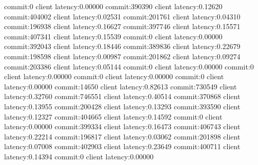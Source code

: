commit:0 client latency:0.00000
commit:390390 client latency:0.12620
commit:404002 client latency:0.02531
commit:201761 client latency:0.04310
commit:196938 client latency:0.16627
commit:397746 client latency:0.15571
commit:407341 client latency:0.15539
commit:0 client latency:0.00000
commit:392043 client latency:0.18446
commit:389836 client latency:0.22679
commit:198598 client latency:0.00987
commit:201862 client latency:0.09274
commit:203386 client latency:0.05144
commit:0 client latency:0.00000
commit:0 client latency:0.00000
commit:0 client latency:0.00000
commit:0 client latency:0.00000
commit:14650 client latency:0.82613
commit:730549 client latency:0.32760
commit:746551 client latency:0.40514
commit:370868 client latency:0.13955
commit:200428 client latency:0.13293
commit:393590 client latency:0.12327
commit:404665 client latency:0.14592
commit:0 client latency:0.00000
commit:399334 client latency:0.16473
commit:406743 client latency:0.22214
commit:196817 client latency:0.03062
commit:201898 client latency:0.07008
commit:402903 client latency:0.23649
commit:400711 client latency:0.14394
commit:0 client latency:0.00000